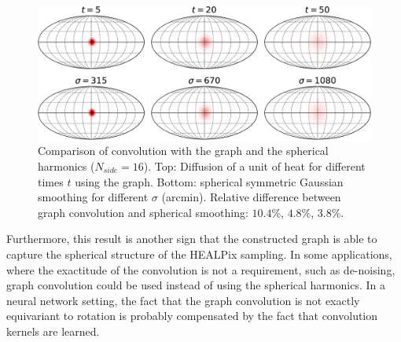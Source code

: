 \documentclass[final,twocolumn,3p,times,sort&compress]{elsarticle}
\newcommand{\1}{\b{1}}              %
\newcommand{\0}{\b{0}}              %
\begin{document}
\begin{figure}
  \centering
  \includegraphics[width=\linewidth]{gaussian_filters_sphere}
  \caption{Comparison of convolution with the graph and the spherical harmonics ($N_{side} = 16$).
  Top: Diffusion of a unit of heat for different times $t$ using the graph.
  Bottom: spherical symmetric Gaussian smoothing for different $\sigma$ (arcmin).
  Relative difference between graph convolution and spherical smoothing: $10.4$\%, $4.8$\%, $3.8$\%.
}
  \label{fig:gaussian_filters_comparizon}
\end{figure}

Furthermore, this result is another sign that the constructed graph is able to capture the spherical
structure of the HEALPix sampling. In some applications, where the
exactitude of the convolution is not a requirement, such as de-noising, graph convolution could be used instead of using the spherical harmonics.
In a neural network setting, the fact that the graph convolution is not exactly equivariant to rotation is probably compensated by the fact that convolution kernels are learned.
\end{document}
